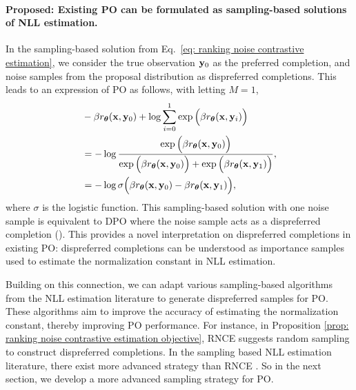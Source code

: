 \paragraph{Proposed: Existing PO can be formulated as sampling-based solutions of NLL estimation.}
In the sampling-based solution from Eq.~\eqref{eq: ranking noise contrastive estimation},
we consider the true observation $\mathbf{y}_0$ as the preferred completion,
and noise samples from the proposal distribution as dispreferred completions.
This leads to an expression of PO as follows, with letting $M=1$,
\begin{align*}
& 
-
\beta
r_{\boldsymbol\theta}(\mathbf{x}, \mathbf{y}_0)
+
\log
{\sum_{i=0}^1 \exp
\Big(
\beta
r_{\boldsymbol\theta}(\mathbf{x}, \mathbf{y}_i)
\Big)}
\\
&
=
- \log
\frac{
\exp
\Big(
\beta
r_{\boldsymbol\theta}(\mathbf{x}, \mathbf{y}_0)
\Big)
}
{
\exp
\Big(
\beta
r_{\boldsymbol\theta}(\mathbf{x}, \mathbf{y}_0)
\Big)
+
\exp
\Big(
\beta
r_{\boldsymbol\theta}(\mathbf{x}, \mathbf{y}_1)
\Big)
},
\\
& =
- \log \sigma
\Big(
\beta
r_{\boldsymbol\theta}(\mathbf{x}, \mathbf{y}_0)
-
\beta
r_{\boldsymbol\theta}(\mathbf{x}, \mathbf{y}_1)
\Big),
\end{align*}
where $\sigma$ is the logistic function.
This sampling-based solution with one noise sample is equivalent to DPO  where the noise sample acts as a dispreferred completion ().
This provides a novel interpretation on dispreferred completions in existing PO:
dispreferred completions can be understood as importance samples used to estimate the normalization constant in NLL estimation.


Building on this connection, we can adapt various sampling-based algorithms from the NLL estimation literature to generate dispreferred samples for PO. 
These algorithms aim to improve the accuracy of estimating the normalization constant, thereby improving PO performance.
For instance,
in Proposition \ref{prop: ranking noise contrastive estimation objective},
RNCE suggests random sampling to construct dispreferred completions. 
In the sampling based NLL estimation literature, there exist more advanced strategy than RNCE \cite{olmin2024connection}. So in the next section, we develop a more advanced sampling strategy for PO.




